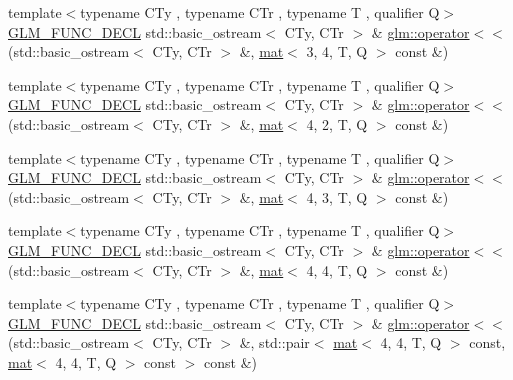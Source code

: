 \begin{DoxyCompactItemize}
\item 
{\footnotesize template$<$typename C\+Ty , typename C\+Tr , typename T , qualifier Q$>$ }\\\mbox{\hyperlink{setup_8hpp_ab2d052de21a70539923e9bcbf6e83a51}{G\+L\+M\+\_\+\+F\+U\+N\+C\+\_\+\+D\+E\+CL}} std\+::basic\+\_\+ostream$<$ C\+Ty, C\+Tr $>$ \& \mbox{\hyperlink{group__gtx__io_gaa6f5541be2f182df05341e1d254c9a93}{glm\+::operator$<$$<$}} (std\+::basic\+\_\+ostream$<$ C\+Ty, C\+Tr $>$ \&, \mbox{\hyperlink{structglm_1_1mat}{mat}}$<$ 3, 4, T, Q $>$ const \&)
\item 
{\footnotesize template$<$typename C\+Ty , typename C\+Tr , typename T , qualifier Q$>$ }\\\mbox{\hyperlink{setup_8hpp_ab2d052de21a70539923e9bcbf6e83a51}{G\+L\+M\+\_\+\+F\+U\+N\+C\+\_\+\+D\+E\+CL}} std\+::basic\+\_\+ostream$<$ C\+Ty, C\+Tr $>$ \& \mbox{\hyperlink{group__gtx__io_gae565f5723d3912d17e295953290fd04b}{glm\+::operator$<$$<$}} (std\+::basic\+\_\+ostream$<$ C\+Ty, C\+Tr $>$ \&, \mbox{\hyperlink{structglm_1_1mat}{mat}}$<$ 4, 2, T, Q $>$ const \&)
\item 
{\footnotesize template$<$typename C\+Ty , typename C\+Tr , typename T , qualifier Q$>$ }\\\mbox{\hyperlink{setup_8hpp_ab2d052de21a70539923e9bcbf6e83a51}{G\+L\+M\+\_\+\+F\+U\+N\+C\+\_\+\+D\+E\+CL}} std\+::basic\+\_\+ostream$<$ C\+Ty, C\+Tr $>$ \& \mbox{\hyperlink{group__gtx__io_ga203dc1828e9c231fed8dc8c000db2e17}{glm\+::operator$<$$<$}} (std\+::basic\+\_\+ostream$<$ C\+Ty, C\+Tr $>$ \&, \mbox{\hyperlink{structglm_1_1mat}{mat}}$<$ 4, 3, T, Q $>$ const \&)
\item 
{\footnotesize template$<$typename C\+Ty , typename C\+Tr , typename T , qualifier Q$>$ }\\\mbox{\hyperlink{setup_8hpp_ab2d052de21a70539923e9bcbf6e83a51}{G\+L\+M\+\_\+\+F\+U\+N\+C\+\_\+\+D\+E\+CL}} std\+::basic\+\_\+ostream$<$ C\+Ty, C\+Tr $>$ \& \mbox{\hyperlink{group__gtx__io_ga269b4fa07fb9fe97faee573e9ccd9306}{glm\+::operator$<$$<$}} (std\+::basic\+\_\+ostream$<$ C\+Ty, C\+Tr $>$ \&, \mbox{\hyperlink{structglm_1_1mat}{mat}}$<$ 4, 4, T, Q $>$ const \&)
\item 
{\footnotesize template$<$typename C\+Ty , typename C\+Tr , typename T , qualifier Q$>$ }\\\mbox{\hyperlink{setup_8hpp_ab2d052de21a70539923e9bcbf6e83a51}{G\+L\+M\+\_\+\+F\+U\+N\+C\+\_\+\+D\+E\+CL}} std\+::basic\+\_\+ostream$<$ C\+Ty, C\+Tr $>$ \& \mbox{\hyperlink{group__gtx__io_gae88c98b45bbff402d42b08bcea9922cb}{glm\+::operator$<$$<$}} (std\+::basic\+\_\+ostream$<$ C\+Ty, C\+Tr $>$ \&, std\+::pair$<$ \mbox{\hyperlink{structglm_1_1mat}{mat}}$<$ 4, 4, T, Q $>$ const, \mbox{\hyperlink{structglm_1_1mat}{mat}}$<$ 4, 4, T, Q $>$ const $>$ const \&)
\end{DoxyCompactItemize}


